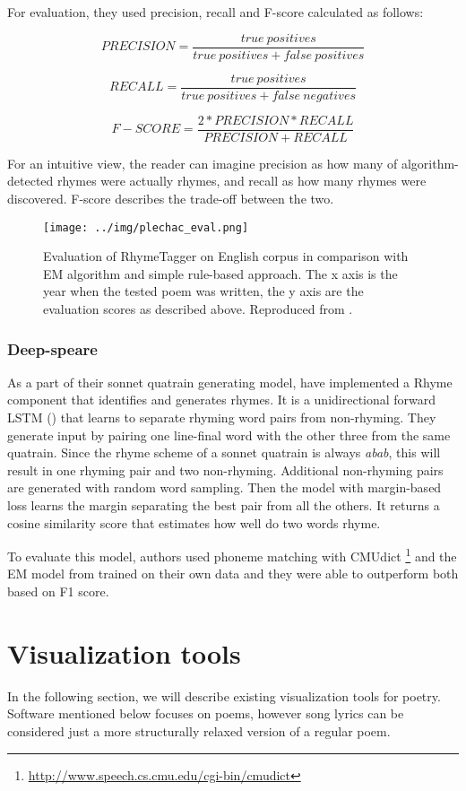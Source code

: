 For evaluation, they used precision, recall and F-score calculated as follows:

\[PRECISION=\frac{true\ positives}{true\ positives+false\ positives}\]

\[RECALL=\frac{true\ positives}{true\ positives+false\ negatives}\]

\[F-SCORE=\frac{2*PRECISION*RECALL}{PRECISION+RECALL}\]

For an intuitive view, the reader can imagine precision as how many of algorithm-detected rhymes were actually rhymes, and recall as how many rhymes were discovered. F-score describes the trade-off between the two.

\begin{figure}[h]\centering
	\texttt{[image: ../img/plechac\_eval.png]}
	\caption[RhymeTagger evaluation]{Evaluation of RhymeTagger on English corpus in comparison with EM algorithm and simple rule-based approach. The x axis is the year when the tested poem was written, the y axis are the evaluation scores as described above. Reproduced from \cite{plechac2017presentation}.}
	\label{screenshotRT}
\end{figure}


\subsubsection*{Deep-speare}
As a part of their \gls{sonnet} \gls{quatrain} generating model, \cite{lau2018deep} have implemented a Rhyme component that identifies and generates rhymes. It is a unidirectional forward \gls{LSTM} (\cite{hochreiter1997long}) that learns to separate rhyming word pairs from non-rhyming. They generate input by pairing one line-final word with the other three from the same quatrain. Since the rhyme scheme of a \gls{sonnet} \gls{quatrain} is always \textit{abab}, this will result in one rhyming pair and two non-rhyming. Additional non-rhyming pairs are generated with random word sampling. Then the model with margin-based loss learns the margin separating the best pair from all the others. It returns a cosine similarity score that estimates how well do two words rhyme.

To evaluate this model, authors used phoneme matching with CMUdict \footnote{\url{http://www.speech.cs.cmu.edu/cgi-bin/cmudict}} and the EM model from \cite{reddy2011unsupervised} trained on their own data and they were able to outperform both based on F1 score.



\section{Visualization tools}
In the following section, we will describe existing visualization tools for poetry. Software mentioned below focuses on poems, however song lyrics can be considered just a more structurally relaxed version of a regular poem.
